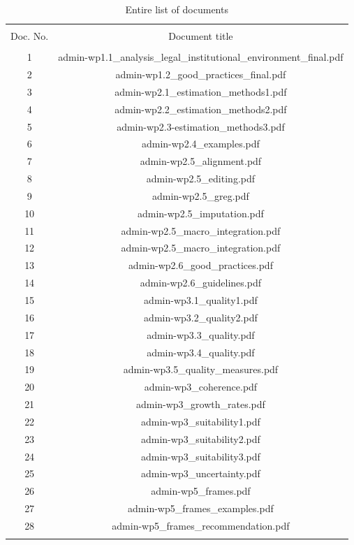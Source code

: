\documentclass[11pt,a4paper]{article}
\begin{document}
\begin{table}[!htbp] \centering 
	\caption{Entire list of documents} 
	\label{document_list} 
	\begin{tabular}{@{\extracolsep{5pt}} cc} 
		\\[-1.8ex]\hline 
		\hline \\[-1.8ex] 
		Doc. No. & Document title \\ 
		\hline \\[-1.8ex] 
		1 & admin-wp1.1\_analysis\_legal\_institutional\_environment\_final.pdf \\ 
		2 & admin-wp1.2\_good\_practices\_final.pdf \\ 
		3 & admin-wp2.1\_estimation\_methods1.pdf \\ 
		4 & admin-wp2.2\_estimation\_methods2.pdf \\ 
		5 & admin-wp2.3-estimation\_methods3.pdf \\ 
		6 & admin-wp2.4\_examples.pdf \\ 
		7 & admin-wp2.5\_alignment.pdf \\ 
		8 & admin-wp2.5\_editing.pdf \\ 
		9 & admin-wp2.5\_greg.pdf \\ 
		10 & admin-wp2.5\_imputation.pdf \\ 
		11 & admin-wp2.5\_macro\_integration.pdf \\ 
		12 & admin-wp2.5\_macro\_integration.pdf \\ 
		13 & admin-wp2.6\_good\_practices.pdf \\ 
		14 & admin-wp2.6\_guidelines.pdf \\ 
		15 & admin-wp3.1\_quality1.pdf \\ 
		16 & admin-wp3.2\_quality2.pdf \\ 
		17 & admin-wp3.3\_quality.pdf \\ 
		18 & admin-wp3.4\_quality.pdf \\ 
		19 & admin-wp3.5\_quality\_measures.pdf \\ 
		20 & admin-wp3\_coherence.pdf \\ 
		21 & admin-wp3\_growth\_rates.pdf \\ 
		22 & admin-wp3\_suitability1.pdf \\ 
		23 & admin-wp3\_suitability2.pdf \\ 
		24 & admin-wp3\_suitability3.pdf \\ 
		25 & admin-wp3\_uncertainty.pdf \\ 
		26 & admin-wp5\_frames.pdf \\ 
		27 & admin-wp5\_frames\_examples.pdf \\ 
		28 & admin-wp5\_frames\_recommendation.pdf \\ 
		\hline \\[-1.8ex] 
	\end{tabular} 
\end{table} 
\end{document}
